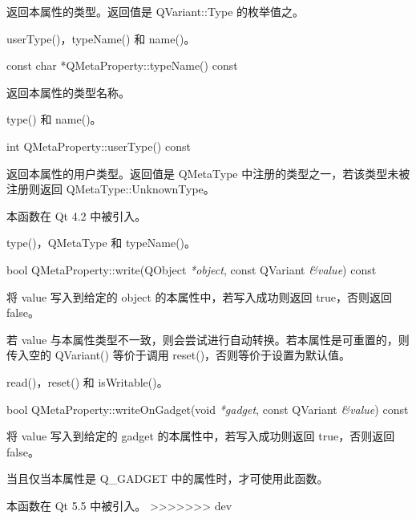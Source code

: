 返回本属性的类型。返回值是 QVariant::Type 的枚举值之。

\begin{seeAlso}
userType()，typeName() 和 name()。
\end{seeAlso}

const char *QMetaProperty::typeName() const

返回本属性的类型名称。

\begin{seeAlso}
type() 和 name()。
\end{seeAlso}

int QMetaProperty::userType() const

返回本属性的用户类型。返回值是 QMetaType 中注册的类型之一，若该类型未被注册则返回 QMetaType::UnknownType。

本函数在 Qt 4.2 中被引入。

\begin{seeAlso}
type()，QMetaType 和 typeName()。
\end{seeAlso}

bool QMetaProperty::write(QObject \emph{*object}, const QVariant \emph{\&value}) const

将 value 写入到给定的 object 的本属性中，若写入成功则返回 true，否则返回 false。

若 value 与本属性类型不一致，则会尝试进行自动转换。若本属性是可重置的，则传入空的 QVariant() 等价于调用 reset()，否则等价于设置为默认值。

\begin{seeAlso}
read()，reset() 和 isWritable()。
\end{seeAlso}

bool QMetaProperty::writeOnGadget(void \emph{*gadget}, const QVariant \emph{\&value}) const

将 value 写入到给定的 gadget 的本属性中，若写入成功则返回 true，否则返回 false。

当且仅当本属性是 Q\_GADGET 中的属性时，才可使用此函数。

本函数在 Qt 5.5 中被引入。
>>>>>>> dev
